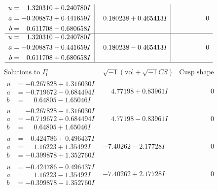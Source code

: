 \documentclass[1p]{elsarticle_modified}
\theoremstyle{definition}
\newcommand{\I}{\sqrt{-1}}
\begin{document}
$$\begin{array}{c|c|c}
\begin{aligned}
u &= \phantom{-}1.320310 + 0.240780 I \\
a &= -0.208873 + 0.441659 I \\
b &= \phantom{-}0.611708 - 0.680658 I\end{aligned}
 & \phantom{-}0.180238 + 0.465413 I & \phantom{-0.000000 } 0 \\ \hline\begin{aligned}
u &= \phantom{-}1.320310 - 0.240780 I \\
a &= -0.208873 - 0.441659 I \\
b &= \phantom{-}0.611708 + 0.680658 I\end{aligned}
 & \phantom{-}0.180238 - 0.465413 I & \phantom{-0.000000 } 0\\
 \hline 
 \end{array}$$\newpage$$\begin{array}{c|c|c}  
\text{Solutions to }I^u_{1}& \I (\text{vol} + \sqrt{-1}CS) & \text{Cusp shape}\\
 \hline 
\begin{aligned}
u &= -0.267828 + 1.316030 I \\
a &= -0.719672 - 0.684494 I \\
b &= \phantom{-}0.64805 - 1.65046 I\end{aligned}
 & \phantom{-}4.77198 + 0.83961 I & \phantom{-0.000000 } 0 \\ \hline\begin{aligned}
u &= -0.267828 - 1.316030 I \\
a &= -0.719672 + 0.684494 I \\
b &= \phantom{-}0.64805 + 1.65046 I\end{aligned}
 & \phantom{-}4.77198 - 0.83961 I & \phantom{-0.000000 } 0 \\ \hline\begin{aligned}
u &= -0.424786 + 0.496437 I \\
a &= \phantom{-}1.16223 + 1.35492 I \\
b &= -0.399878 + 1.352760 I\end{aligned}
 & -7.40262 - 2.17728 I & \phantom{-0.000000 } 0 \\ \hline\begin{aligned}
u &= -0.424786 - 0.496437 I \\
a &= \phantom{-}1.16223 - 1.35492 I \\
b &= -0.399878 - 1.352760 I\end{aligned}
 & -7.40262 + 2.17728 I & \phantom{-0.000000 } 0 \\ \hline\begin{aligned}

\end{aligned}
\end{array}$$
\end{document}
